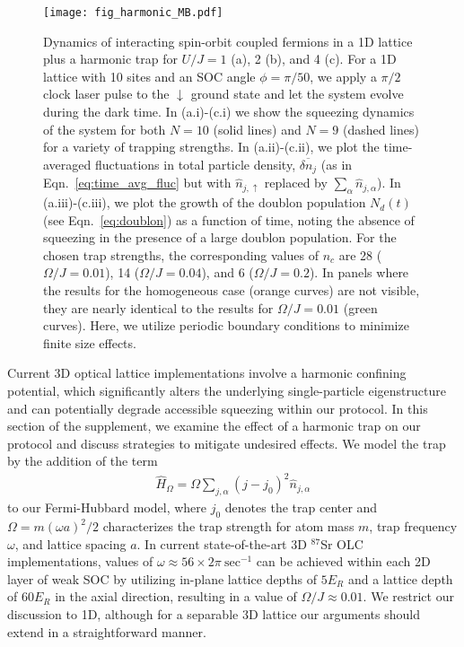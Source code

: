 \documentclass{nature}
\renewcommand{\t}{\text} %
\begin{document}
\begin{spacing}{1}
\begin{figure}
    \texttt{[image: fig\_harmonic\_MB.pdf]}
    \label{fig:harmonic_trap_MB1}
    \caption{Dynamics of interacting spin-orbit  coupled fermions in a 1D lattice plus a harmonic trap for $U/J = 1$ (a), 2 (b), and 4 (c). For a 1D lattice with 10 sites and an SOC angle $\phi = \pi/50$, we apply a $\pi/2$ clock laser pulse to the $\downarrow$ ground state and let the system evolve during the dark time. In (a.i)-(c.i) we show the squeezing dynamics of the system for both $N = 10$ (solid lines) and $N = 9$ (dashed lines) for a variety of trapping strengths. In (a.ii)-(c.ii), we plot the time-averaged fluctuations in total particle density, $\overline{\delta n_j}$ (as in Eqn.~\eqref{eq:time_avg_fluc} but with $\hat{n}_{j,\uparrow}$ replaced by $\sum_{\alpha}\hat{n}_{j,\alpha}$). In (a.iii)-(c.iii), we plot the growth of the doublon population $N_d(t)$ (see Eqn.~\eqref{eq:doublon}) as a function of time, noting the absence of squeezing in the presence of a large doublon population. For the chosen trap strengths, the corresponding values of $n_c$ are 28 ($\Omega/J = 0.01$), 14 ($\Omega/J = 0.04$), and 6 ($\Omega/J = 0.2$). In panels where the results for the homogeneous case (orange curves) are not visible, they are nearly identical to the results for $\Omega/J = 0.01$ (green curves). Here, we utilize periodic boundary conditions to minimize finite size effects.}
    \label{fig:harmonic_trap_MB}
\end{figure}
\end{spacing}

Current 3D optical lattice implementations involve a harmonic confining potential, which significantly alters the underlying single-particle eigenstructure and can potentially degrade accessible squeezing within our protocol. In this section of the supplement, we examine the effect of a harmonic trap on our protocol and discuss strategies to mitigate undesired effects. We model the trap by the addition of the term
\begin{align}
  \hat{H}_{\Omega}
  = \Omega\sum_{j,\alpha}(j-j_0)^2\hat{n}_{j,\alpha}
\end{align}
to our Fermi-Hubbard model, where $j_0$ denotes the trap center and $\Omega = m(\omega a)^2/2$ characterizes the trap strength for atom mass $m$, trap frequency $\omega$, and lattice spacing $a$. In current state-of-the-art 3D $^{87}$Sr OLC implementations, values of $\omega \approx 56 \times 2\pi~\t{sec}^{-1}$ can be achieved within each 2D layer of weak SOC by utilizing in-plane lattice depths of $5 E_R$ and a lattice depth of $60 E_R$ in the axial direction, resulting in a value of $\Omega/J \approx 0.01$. We restrict our discussion to 1D, although for a separable 3D lattice our arguments should extend in a straightforward manner.
\end{document}
